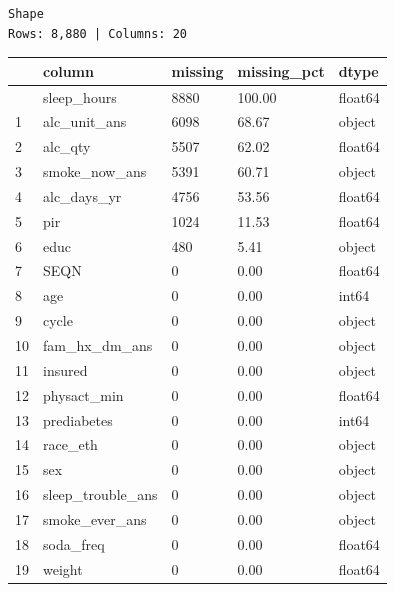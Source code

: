 \documentclass[
  letterpaper,
  DIV=11,
  numbers=noendperiod]{scrartcl}
\begin{document}
\begin{verbatim}
Shape
Rows: 8,880 | Columns: 20
\end{verbatim}

\begin{longtable}[]{@{}lllll@{}}
\toprule\noalign{}
& column & missing & missing\_pct & dtype \\
\midrule\noalign{}
\endhead
\bottomrule\noalign{}
\endlastfoot
0 & sleep\_hours & 8880 & 100.00 & float64 \\
1 & alc\_unit\_ans & 6098 & 68.67 & object \\
2 & alc\_qty & 5507 & 62.02 & float64 \\
3 & smoke\_now\_ans & 5391 & 60.71 & object \\
4 & alc\_days\_yr & 4756 & 53.56 & float64 \\
5 & pir & 1024 & 11.53 & float64 \\
6 & educ & 480 & 5.41 & object \\
7 & SEQN & 0 & 0.00 & float64 \\
8 & age & 0 & 0.00 & int64 \\
9 & cycle & 0 & 0.00 & object \\
10 & fam\_hx\_dm\_ans & 0 & 0.00 & object \\
11 & insured & 0 & 0.00 & object \\
12 & physact\_min & 0 & 0.00 & float64 \\
13 & prediabetes & 0 & 0.00 & int64 \\
14 & race\_eth & 0 & 0.00 & object \\
15 & sex & 0 & 0.00 & object \\
16 & sleep\_trouble\_ans & 0 & 0.00 & object \\
17 & smoke\_ever\_ans & 0 & 0.00 & object \\
18 & soda\_freq & 0 & 0.00 & float64 \\
19 & weight & 0 & 0.00 & float64 \\
\end{longtable}
\end{document}
